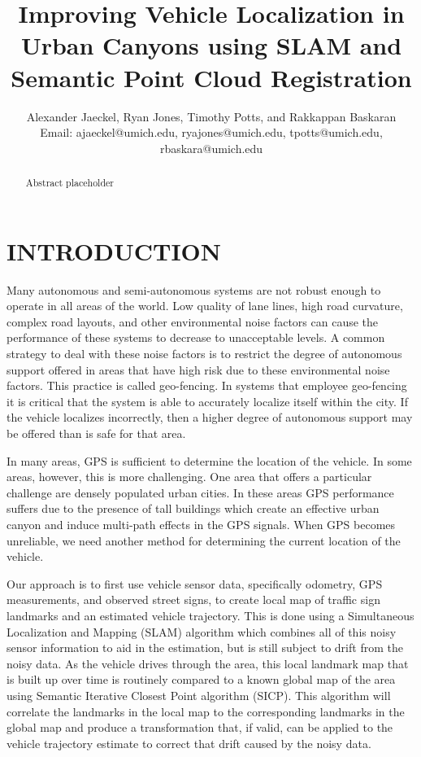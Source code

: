 \documentclass[letterpaper, 10 pt, conference]{ieeeconf}  %
\title{\LARGE \bf
Improving Vehicle Localization in Urban Canyons using SLAM and Semantic Point Cloud Registration
}
\author{Alexander Jaeckel, Ryan Jones, Timothy Potts, and Rakkappan Baskaran\\%
Email: ajaeckel@umich.edu, ryajones@umich.edu, tpotts@umich.edu, rbaskara@umich.edu
}
\begin{document}
\maketitle
\thispagestyle{empty}
\pagestyle{empty}


\begin{abstract}

Abstract placeholder

\end{abstract}


\section{INTRODUCTION}

Many autonomous and semi-autonomous systems are not robust enough to operate in all areas of the world. Low quality of lane lines, high road curvature, complex road layouts, and other environmental noise factors can cause the performance of these systems to decrease to unacceptable levels. A common strategy to deal with these noise factors is to restrict the degree of autonomous support offered in areas that have high risk due to these environmental noise factors. This practice is called geo-fencing. In systems that employee geo-fencing it is critical that the system is able to accurately localize itself within the city. If the vehicle localizes incorrectly, then a higher degree of autonomous support may be offered than is safe for that area. 

In many areas, GPS is sufficient to determine the location of the vehicle. In some areas, however, this is more challenging. One area that offers a particular challenge are densely populated urban cities. In these areas GPS performance suffers due to the presence of tall buildings which create an effective urban canyon and induce multi-path effects in the GPS signals. When GPS becomes unreliable, we need another method for determining the current location of the vehicle.

Our approach is to first use vehicle sensor data, specifically odometry, GPS measurements, and observed street signs, to create local map of traffic sign landmarks and an estimated vehicle trajectory. This is done using a Simultaneous Localization and Mapping (SLAM) algorithm which combines all of this noisy sensor information to aid in the estimation, but is still subject to drift from the noisy data. As the vehicle drives through the area, this local landmark map that is built up over time is routinely compared to a known global map of the area using Semantic Iterative Closest Point algorithm (SICP). This algorithm will correlate the landmarks in the local map to the corresponding landmarks in the global map and produce a transformation that, if valid, can be applied to the vehicle trajectory estimate to correct that drift caused by the noisy data.
\end{document}
